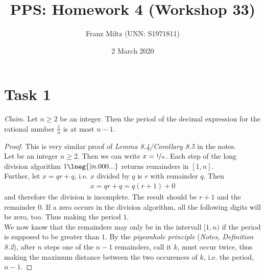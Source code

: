 \documentclass{article}
\title{PPS: Homework 4 (Workshop 33)}
\author{Franz Miltz (UNN: S1971811)}
\date{2 March 2020}
\begin{document}
\maketitle
\section*{Task 1}
\emph{Claim.} Let $n\geq 2$ be an integer. Then the period of the decimal expression for the rational number $\frac{1}{n}$ is at most $n-1$.
\begin{proof}
  This is very similar proof of \emph{Lemma 8.4/Corollary 8.5} in the notes.\\
  Let be an integer $n\geq 2$. Then we can write $x=\nicefrac{1}{n}$. Each step of the long division algorithm $1\lneg{)n.000...}$ returns remainders in $[1,n]$.\\
  Further, let $x=qr+q$, i.e. $x$ divided by $q$ is $r$ with remainder $q$. Then
  \begin{align*}
    x = qr+q = q(r+1)+0
  \end{align*}
  and therefore the division is incomplete. The result should be $r+1$ and the remainder $0$. If a zero occurs in the division algorithm, all the following digits will be zero, too. Thus making the period $1$.\\
  We now know that the remainders may only be in the intervall $[1, n)$ if the period is supposed to be greater than $1$. By the \emph{pigeonhole principle} (\emph{Notes, Definition 8.2}), after $n$ steps one of the $n-1$ remainders, call it $k$, must occur twice, thus making the maximum distance between the two occurences of $k$, i.e. the period, $n-1$.

\end{proof}
\end{document}
